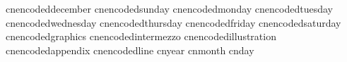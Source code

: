    cnencodeddecember         {}
   cnencodedsunday           {}
   cnencodedmonday           {}
   cnencodedtuesday          {}
   cnencodedwednesday        {}
   cnencodedthursday         {}
   cnencodedfriday           {}
   cnencodedsaturday         {}
   cnencodedgraphics         {}
   cnencodedintermezzo       {}
   cnencodedillustration     {}
   cnencodedappendix         {}
   cnencodedline             {}
   cnyear                    {}
   cnmonth                   {}
   cnday                     {}
\stopencoding

